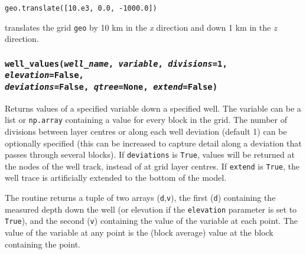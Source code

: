 \begin{lstlisting}
geo.translate([10.e3, 0.0, -1000.0])
\end{lstlisting}

translates the grid \texttt{geo} by 10 km in the \emph{x} direction and down 1 km in the \emph{z} direction.

\begin{snugshade}
\subsubsection{\texttt{well\_values(\emph{well\_name}, \emph{variable}, \emph{divisions}=1, \emph{elevation}=\texttt{False}, \\
    \emph{deviations}=\texttt{False}, \emph{qtree}=None, \emph{extend}=\texttt{False})}}
\end{snugshade}
\label{sec:mulgrid:well_values}

Returns values of a specified variable down a specified well.  The variable can be a list or \texttt{np.array} containing a value for every block in the grid.  The number of divisions between layer centres or along each well deviation (default 1) can be optionally specified (this can be increased to capture detail along a deviation that passes through several blocks).  If \texttt{deviations} is \texttt{True}, values will be returned at the nodes of the well track, instead of at grid layer centres.  If \texttt{extend} is \texttt{True}, the well trace is artificially extended to the bottom of the model.

The routine returns a tuple of two arrays (\texttt{d},\texttt{v}), the first (\texttt{d}) containing the measured depth down the well (or elevation if the \texttt{elevation} parameter is set to \texttt{True}), and the second (\texttt{v}) containing the value of the variable at each point.  The value of the variable at any point is the (block average) value at the block containing the point.


